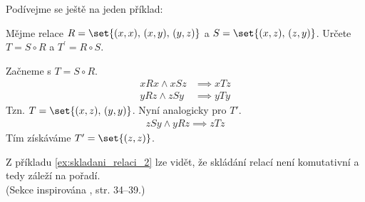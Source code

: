 Podívejme se ještě na jeden příklad:
\begin{example}\label{ex:skladani_relaci_2}
    Mějme relace $R=\set{(x,x),\,(x,y),\,(y,z)}$ a $S=\set{(x,z),\,(z,y)}$. Určete $T=S\circ R$ a $T^\prime=R\circ S$.
\end{example}
\begin{solution}
    Začneme s $T=S\circ R$.
    \begin{align*}
        xRx \land xSz &\implies xTz\\
        yRz \land zSy &\implies yTy
    \end{align*}
    Tzn. $T=\set{(x,z),\,(y,y)}$. Nyní analogicky pro $T\prime$.
    \begin{align*}
        zSy \land yRz \implies zTz
    \end{align*}
    Tím získáváme $T^\prime=\set{(z,z)}$.
\end{solution}
Z příkladu \ref{ex:skladani_relaci_2} lze vidět, že skládání relací není komutativní a tedy záleží na pořadí.\\
(Sekce inspirována \cite{MatousekNesetril2009}, str. 34--39.)